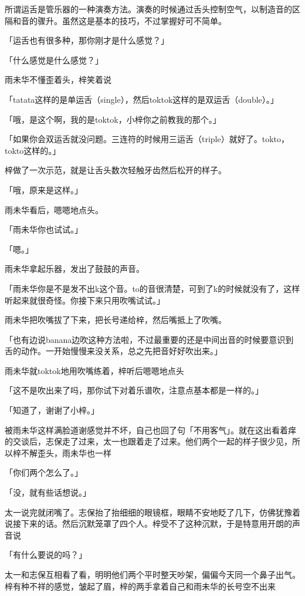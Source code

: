 \documentclass[UTF8]{ctexart}
\begin{document}
    所谓运舌是管乐器的一种演奏方法。演奏的时候通过舌头控制空气，以制造音的区隔和音的骤升。虽然这是基本的技巧，不过掌握好可不简单。

    「运舌也有很多种，那你刚才是什么感觉？」

    「什么感觉是什么感觉？」

    雨未华不懂歪着头，梓笑着说

    「tatata这样的是单运舌（single），然后toktok这样的是双运舌（double）。」

    「哦，是这个啊，我的是toktok，小梓你之前教我的那个。」

    「如果你会双运舌就没问题。三连符的时候用三运舌（triple）就好了。tokto，tokto这样的。」

    梓做了一次示范，就是让舌头数次轻触牙齿然后松开的样子。

    「哦，原来是这样。」

    雨未华看后，嗯嗯地点头。

    「雨未华你也试试。」

    「嗯。」

    雨未华拿起乐器，发出了鼓鼓的声音。

    「雨未华你是不是发不出k这个音。to的音很清楚，可到了k的时候就没有了，这样听起来就很奇怪。你接下来只用吹嘴试试。」

    雨未华把吹嘴拔了下来，把长号递给梓，然后嘴抵上了吹嘴。

    「也有边说banana边吹这种方法啦，不过最重要的还是中间出音的时候要意识到舌的动作。一开始慢慢来没关系，总之先把音好好吹出来。」

    雨未华就toktok地用吹嘴练着，梓听后嗯嗯地点头

    「这不是吹出来了吗，那你试下对着乐谱吹，注意点基本都是一样的。」

    「知道了，谢谢了小梓。」

    被雨未华这样满脸道谢感觉并不坏，自己也回了句「不用客气」。就在这出看着痒的交谈后，志保走了过来，太一也跟着走了过来。他们两个一起的样子很少见，所以梓不解歪头，雨未华也一样

    「你们两个怎么了。」

    「没，就有些话想说。」

    太一说完就闭嘴了。志保抬了抬细细的眼镜框，眼睛不安地眨了几下，仿佛犹豫着说接下来的话。然后沉默笼罩了四个人。梓受不了这种沉默，于是特意用开朗的声音说

    「有什么要说的吗？」

    太一和志保互相看了看，明明他们两个平时整天吵架，偏偏今天同一个鼻子出气。梓有种不祥的感觉，皱起了眉，梓的两手拿着自己和雨未华的长号空不出来
\end{document}
